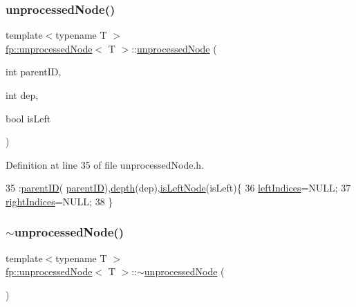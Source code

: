 \subsubsection{\texorpdfstring{unprocessed\+Node()}{unprocessedNode()}\hspace{0.1cm}{\footnotesize\ttfamily [2/2]}}
{\footnotesize\ttfamily template$<$typename T $>$ \\
\hyperlink{classfp_1_1unprocessedNode}{fp\+::unprocessed\+Node}$<$ T $>$\+::\hyperlink{classfp_1_1unprocessedNode}{unprocessed\+Node} (\begin{DoxyParamCaption}\item[{int}]{parent\+ID,  }\item[{int}]{dep,  }\item[{bool}]{is\+Left }\end{DoxyParamCaption})\hspace{0.3cm}{\ttfamily [inline]}}



Definition at line 35 of file unprocessed\+Node.\+h.


\begin{DoxyCode}
35                                                                    :\hyperlink{classfp_1_1unprocessedNode_a74cb75f76c24622444e531a583b75c3d}{parentID}(
      \hyperlink{classfp_1_1unprocessedNode_a74cb75f76c24622444e531a583b75c3d}{parentID}),\hyperlink{classfp_1_1unprocessedNode_a22ebfbc35a57e2d30b81220c94f4d0d3}{depth}(dep),\hyperlink{classfp_1_1unprocessedNode_a81b74c36ed1ac15d367e135e2fa0ba3d}{isLeftNode}(isLeft)\{
36                     \hyperlink{classfp_1_1unprocessedNode_a0a147fea04670ff34ef0891a14ec67a3}{leftIndices}=NULL;
37                     \hyperlink{classfp_1_1unprocessedNode_a4e805660b305b1056cea187ed5584a1d}{rightIndices}=NULL;
38                 \}
\end{DoxyCode}
\mbox{\label{classfp_1_1unprocessedNode_a3242b54f6a1613c61ffa989b92501ab9}} 
\subsubsection{\texorpdfstring{$\sim$unprocessed\+Node()}{~unprocessedNode()}}
{\footnotesize\ttfamily template$<$typename T $>$ \\
\hyperlink{classfp_1_1unprocessedNode}{fp\+::unprocessed\+Node}$<$ T $>$\+::$\sim$\hyperlink{classfp_1_1unprocessedNode}{unprocessed\+Node} (\begin{DoxyParamCaption}{ }\end{DoxyParamCaption})\hspace{0.3cm}{\ttfamily [inline]}}



